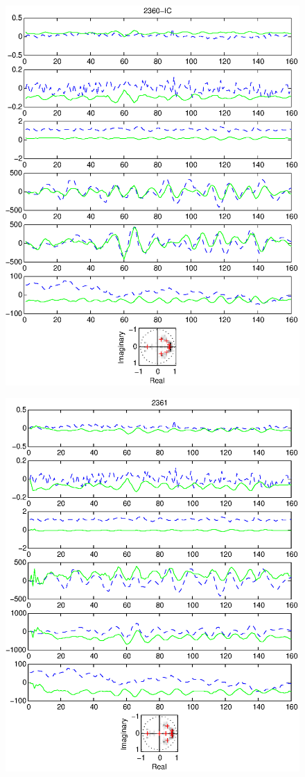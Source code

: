 \documentclass{article}
\begin{document}
\begin{figure}[htb!]\centering
\includegraphics{2360_ic.eps}
\end{figure}\clearpage
\begin{figure}[htb!]\centering
\includegraphics{2361.eps}
\end{figure}\clearpage
\end{document}
